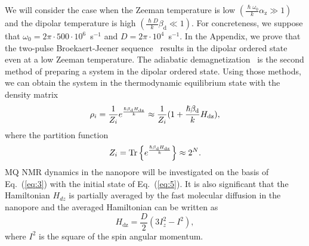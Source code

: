 We will consider the case when the Zeeman temperature is low $({\frac{\hslash \omega_{0}}{k} \alpha_\mathrm{z}}\gg 1)$
and the dipolar temperature is high $\left( \frac{\hslash{D}}{k}\beta_\mathrm{d} \ll 1\right)$.
For concreteness, we suppose that $\omega_{0} = 2\pi \cdot 500 \cdot 10^{6}$~s$^{-1}$ and $D = 2\pi \cdot 10^{4}$~s$^{-1}$.
In the Appendix, we prove that the two-pulse Broekaert-Jeener sequence~\cite{Goldman_1970,Jeener_1967} results in the dipolar ordered state even at a low Zeeman temperature.
The adiabatic demagnetization~\cite{Goldman_1970,Slichter_1961} is the second method of preparing a system in the dipolar ordered state.
Using those methods, we can obtain the system in the thermodynamic equilibrium state with the density matrix
%
\begin{equation}
    \label{eq:5}
    \rho_i = \frac{1}{Z_i} e^\frac{\hslash\beta_\mathrm{d} H_\mathrm{dz}}{k}
    \approx \frac{1}{Z_i}(1 + \frac{\hslash\beta_\mathrm{d}}{k} H_\mathrm{dz}),
\end{equation}
%
where the partition function
%
\begin{equation}
    \label{eq:6}
	Z_i = \mathrm{Tr} \left\{ e^\frac{\hslash\beta_\mathrm{d} H_\mathrm{dz}}{k} \right\} \approx 2^{N}.
\end{equation}
%
MQ NMR dynamics in the nanopore will be investigated on the basis of Eq.~(\ref{eq:3}) with the initial state of Eq.~(\ref{eq:5}).
It is also significant that the Hamiltonian $H_{dz}$ is partially averaged by the fast molecular diffusion in the nanopore and the averaged Hamiltonian can be written as \cite{Fel_dman_2004,Doronin_2011}
%
\begin{equation}
    \label{eq:7}
    H_\mathrm{dz} = \dfrac{D}{2} (3 I^{2}_{z} - I^{2}) , %
\end{equation}
%
where $I^{2}$ is the square of the spin angular momentum.


